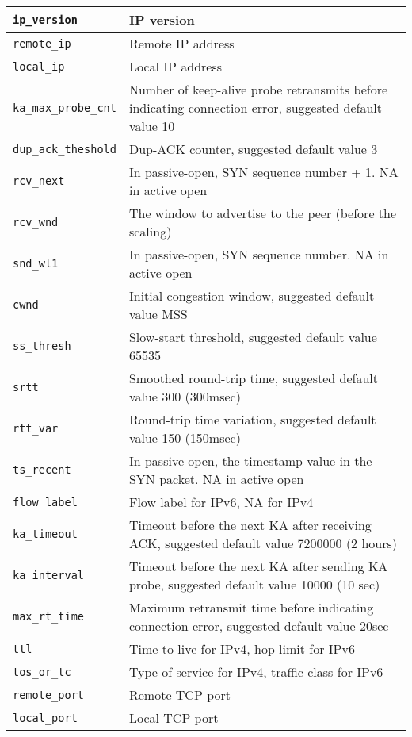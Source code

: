 \documentclass[11pt,fleqn,hidelinks,oneside]{book} %
\begin{document}
\begin{itemize}
\begin{center}
\begin{tabular}{| l | p{10cm} |}
		\texttt{ip\_version} & IP version \\ \hline
		\texttt{remote\_ip} & Remote IP address \\ \hline
		\texttt{local\_ip} & Local IP address \\ \hline
		\texttt{ka\_max\_probe\_cnt} & Number of keep-alive probe retransmits before indicating connection error, suggested default value 10 \\ \hline
		\texttt{dup\_ack\_theshold} & Dup-ACK counter, suggested default value 3 \\ \hline
		\texttt{rcv\_next} & In passive-open, SYN sequence number + 1. NA in active open \\ \hline
		\texttt{rcv\_wnd} & The window to advertise to the peer (before the scaling) \\ \hline
		\texttt{snd\_wl1} & In passive-open, SYN sequence number. NA in active open \\ \hline
		\texttt{cwnd} & Initial congestion window, suggested default value MSS \\ \hline
		\texttt{ss\_thresh} & Slow-start threshold, suggested default value 65535 \\ \hline
		\texttt{srtt} & Smoothed round-trip time, suggested default value 300 (300msec) \\ \hline
		\texttt{rtt\_var} & Round-trip time variation, suggested default value 150 (150msec) \\ \hline
		\texttt{ts\_recent} & In passive-open, the timestamp value in the SYN packet. NA in active open \\ \hline
		\texttt{flow\_label} & Flow label for IPv6, NA for IPv4 \\ \hline
		\texttt{ka\_timeout} & Timeout before the next KA after receiving ACK, suggested default value 7200000 (2 hours) \\ \hline
		\texttt{ka\_interval} & Timeout before the next KA after sending KA probe, suggested default value 10000 (10 sec) \\ \hline
		\texttt{max\_rt\_time} & Maximum retransmit time before indicating connection error, suggested default value 20sec \\ \hline
		\texttt{ttl} & Time-to-live for IPv4, hop-limit for IPv6 \\ \hline
		\texttt{tos\_or\_tc} & Type-of-service for IPv4, traffic-class for IPv6 \\ \hline
		\texttt{remote\_port} & Remote TCP port \\ \hline
		\texttt{local\_port} & Local TCP port \\ \hline

\end{tabular}
\end{center}
\end{itemize}
\end{document}
